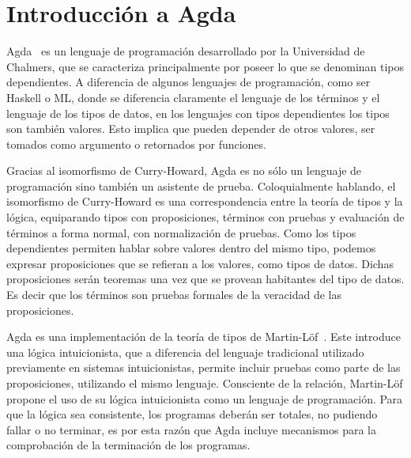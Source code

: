 \chapter{Introducci\'on a Agda} \label{chapter:agda}

\begin{epigraphs}
\end{epigraphs}


Agda~\cite{norell:thesis} es un lenguaje de programación desarrollado por la Universidad de Chalmers, que se caracteriza principalmente por poseer lo que se denominan tipos dependientes. A diferencia de algunos lenguajes de programación, como ser Haskell o ML, donde se diferencia claramente el lenguaje de los términos y el lenguaje de los tipos de datos, en los lenguajes con tipos dependientes los tipos son también valores. Esto implica que pueden depender de otros valores, ser tomados como argumento o retornados por funciones.

Gracias al isomorfismo de Curry-Howard, Agda es no sólo un lenguaje de programación sino también un asistente de prueba. Coloquialmente hablando, el isomorfismo de Curry-Howard es una correspondencia entre la teoría de tipos y la lógica, equiparando tipos con proposiciones, términos con pruebas y evaluación de términos a forma normal, con normalización de pruebas. Como los tipos dependientes permiten hablar sobre valores dentro del mismo tipo, podemos expresar proposiciones que se refieran a los valores, como tipos de datos. Dichas proposiciones serán teoremas una vez que se provean habitantes del tipo de datos. Es decir que los términos son pruebas formales de la veracidad de las proposiciones. 

Agda es una implementación de la teoría de tipos de Martin-Löf~\cite{Martin-Lof-1972,Martin-Lof-1973,Martin-Lof-1979,martin-lof:bibliopolis}. Este introduce una lógica intuicionista, que a diferencia del lenguaje tradicional utilizado previamente en sistemas intuicionistas, permite incluir pruebas como parte de las proposiciones, utilizando el mismo lenguaje. Consciente de la relación, Martin-Löf propone el uso de su lógica intuicionista como un lenguaje de programación. Para que la lógica sea consistente, los programas deberán ser totales, no pudiendo fallar o no terminar, es por esta razón que Agda incluye mecanismos para la comprobación de la terminación de los programas.

